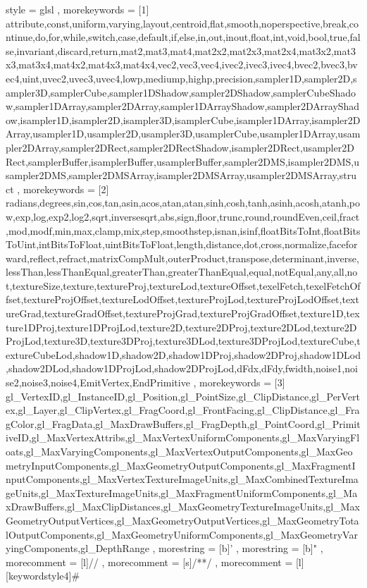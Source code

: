 
{
    style             = glsl
,   morekeywords      = [1]{%
        attribute,const,uniform,varying,layout,centroid,flat,smooth,noperspective,break,continue,do,for,while,switch,case,default,if,else,in,out,inout,float,int,void,bool,true,false,invariant,discard,return,mat2,mat3,mat4,mat2x2,mat2x3,mat2x4,mat3x2,mat3x3,mat3x4,mat4x2,mat4x3,mat4x4,vec2,vec3,vec4,ivec2,ivec3,ivec4,bvec2,bvec3,bvec4,uint,uvec2,uvec3,uvec4,lowp,mediump,highp,precision,sampler1D,sampler2D,sampler3D,samplerCube,sampler1DShadow,sampler2DShadow,samplerCubeShadow,sampler1DArray,sampler2DArray,sampler1DArrayShadow,sampler2DArrayShadow,isampler1D,isampler2D,isampler3D,isamplerCube,isampler1DArray,isampler2DArray,usampler1D,usampler2D,usampler3D,usamplerCube,usampler1DArray,usampler2DArray,sampler2DRect,sampler2DRectShadow,isampler2DRect,usampler2DRect,samplerBuffer,isamplerBuffer,usamplerBuffer,sampler2DMS,isampler2DMS,usampler2DMS,sampler2DMSArray,isampler2DMSArray,usampler2DMSArray,struct}
,	morekeywords      = [2]{%
    radians,degrees,sin,cos,tan,asin,acos,atan,atan,sinh,cosh,tanh,asinh,acosh,atanh,pow,exp,log,exp2,log2,sqrt,inversesqrt,abs,sign,floor,trunc,round,roundEven,ceil,fract,mod,modf,min,max,clamp,mix,step,smoothstep,isnan,isinf,floatBitsToInt,floatBitsToUint,intBitsToFloat,uintBitsToFloat,length,distance,dot,cross,normalize,faceforward,reflect,refract,matrixCompMult,outerProduct,transpose,determinant,inverse,lessThan,lessThanEqual,greaterThan,greaterThanEqual,equal,notEqual,any,all,not,textureSize,texture,textureProj,textureLod,textureOffset,texelFetch,texelFetchOffset,textureProjOffset,textureLodOffset,textureProjLod,textureProjLodOffset,textureGrad,textureGradOffset,textureProjGrad,textureProjGradOffset,texture1D,texture1DProj,texture1DProjLod,texture2D,texture2DProj,texture2DLod,texture2DProjLod,texture3D,texture3DProj,texture3DLod,texture3DProjLod,textureCube,textureCubeLod,shadow1D,shadow2D,shadow1DProj,shadow2DProj,shadow1DLod,shadow2DLod,shadow1DProjLod,shadow2DProjLod,dFdx,dFdy,fwidth,noise1,noise2,noise3,noise4,EmitVertex,EndPrimitive}
,	morekeywords      = [3]{%
        gl_VertexID,gl_InstanceID,gl_Position,gl_PointSize,gl_ClipDistance,gl_PerVertex,gl_Layer,gl_ClipVertex,gl_FragCoord,gl_FrontFacing,gl_ClipDistance,gl_FragColor,gl_FragData,gl_MaxDrawBuffers,gl_FragDepth,gl_PointCoord,gl_PrimitiveID,gl_MaxVertexAttribs,gl_MaxVertexUniformComponents,gl_MaxVaryingFloats,gl_MaxVaryingComponents,gl_MaxVertexOutputComponents,gl_MaxGeometryInputComponents,gl_MaxGeometryOutputComponents,gl_MaxFragmentInputComponents,gl_MaxVertexTextureImageUnits,gl_MaxCombinedTextureImageUnits,gl_MaxTextureImageUnits,gl_MaxFragmentUniformComponents,gl_MaxDrawBuffers,gl_MaxClipDistances,gl_MaxGeometryTextureImageUnits,gl_MaxGeometryOutputVertices,gl_MaxGeometryOutputVertices,gl_MaxGeometryTotalOutputComponents,gl_MaxGeometryUniformComponents,gl_MaxGeometryVaryingComponents,gl_DepthRange}
,   morestring        = [b]'
,   morestring        = [b]"
,	morecomment       = [l]{//}
,	morecomment       = [s]{/*}{*/}
,	morecomment       = [l][keywordstyle4]{\#}
}

{
}
